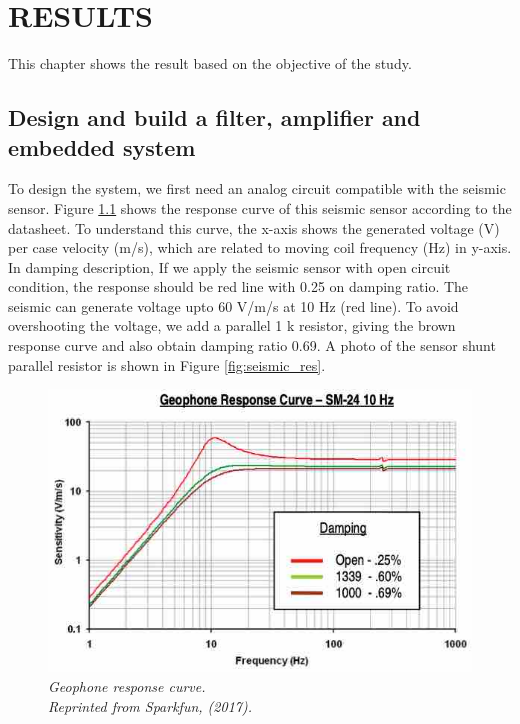 \setlength{\parindent}{0.5in}
\setlength{\parskip}{1em}
\setlength{\baselineskip}{1.6em}

\chapter{RESULTS}
\label{ch:results}
This chapter shows the result based on the objective of the study. 
\section{Design and build a filter, amplifier and embedded system}

To design the system, we first need an analog circuit compatible with the seismic sensor. Figure \ref{fig:seismic_curve} shows the response curve of this seismic sensor according to the datasheet. To understand this curve, the x-axis shows the generated voltage (V) per case velocity (m/s), which are related to moving coil frequency (Hz) in y-axis. In damping description, If we apply the seismic sensor with open circuit condition, the response should be red line with 0.25 on damping ratio. The seismic can generate voltage upto 60 V/m/s at 10 Hz (red line). To avoid overshooting the voltage, we add a parallel 1 k resistor, giving the brown response curve and also obtain damping ratio 0.69. A photo of the sensor shunt parallel resistor is shown in Figure \ref{fig:seismic_res}.

\begin{figure}[H]
  \centering
  \caption[Geophone response curve.]{\emph{Geophone response curve. \\Reprinted from Sparkfun, (2017). }}\label{fig:seismic_curve}
  \includegraphics[scale = 0.7]{figures/seismic_graph.jpg}
\end{figure}

